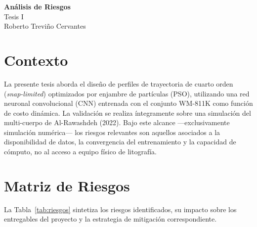 \documentclass[11pt]{article}
\begin{document}
\setcounter{section}{0}

\thispagestyle{empty}

\begin{center}
{\LARGE \bf Análisis de Riesgos}\\[4pt]
{\large Tesis I}\\[2pt]
Roberto Treviño Cervantes
\end{center}

\section{Contexto}

La presente tesis aborda el diseño de perfiles de trayectoria de cuarto orden (\textit{snap-limited}) optimizados por enjambre de partículas (PSO), utilizando una red neuronal convolucional (CNN) entrenada con el conjunto WM-811K como función de costo dinámica. La validación se realiza íntegramente sobre una simulación del multi-cuerpo de Al-Rawashdeh (2022). Bajo este alcance —exclusivamente simulación numérica— los riesgos relevantes son aquellos asociados a la disponibilidad de datos, la convergencia del entrenamiento y la capacidad de cómputo, no al acceso a equipo físico de litografía.

\section{Matriz de Riesgos}

La Tabla~\ref{tab:riesgos} sintetiza los riesgos identificados, su impacto sobre los entregables del proyecto y la estrategia de mitigación correspondiente.
\end{document}
